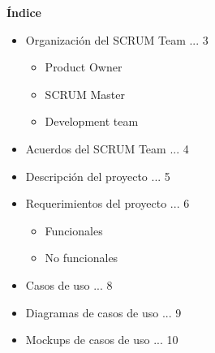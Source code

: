 \documentclass[12pt,letterpaper]{article}
\begin{document}
	\newpage
	\pagestyle{plain}
	{
		\begin{center}
			\par\vspace{0.5cm}
			{
				\Huge\textbf
				{
					\'Indice
				}
			}
		\end{center}
					\begin{itemize}
						\item Organización del SCRUM Team ... 3
                        \begin{itemize}
                            \item Product Owner
                            \item SCRUM Master
                            \item Development team
                        \end{itemize}
						\item Acuerdos del SCRUM Team ... 4
						\item Descripción del proyecto ... 5
						\item Requerimientos del proyecto ... 6
                            \begin{itemize}
                                \item Funcionales
                                \item No funcionales
                            \end{itemize}
                        \item Casos de uso ... 8
                        \item Diagramas de casos de uso ... 9
                        \item Mockups de casos de uso ... 10
					\end{itemize}
			\vfill
	}
	\newpage
	\pagestyle{plain}
\end{document}
